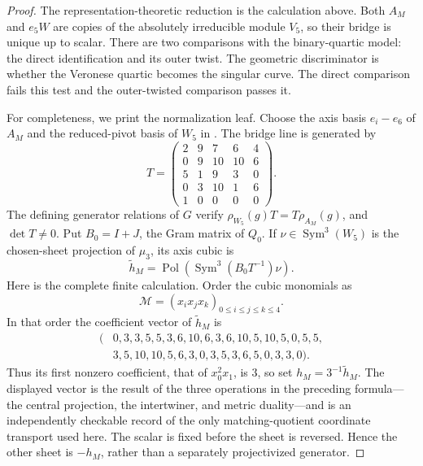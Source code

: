 \documentclass[11pt]{article}
\theoremstyle{definition}
\theoremstyle{remark}
\newcommand{\Sym}{\operatorname{Sym}}
\begin{document}
\begin{proof}
The representation-theoretic reduction is the calculation above.  Both
\(A_M\) and \(e_5W\) are copies of the absolutely irreducible module \(V_5\),
so their bridge is unique up to scalar.  There are two comparisons with the
binary-quartic model: the direct identification and its outer twist.  The
geometric discriminator is whether the Veronese quartic becomes the singular
curve.  The direct comparison fails this test and the outer-twisted
comparison passes it.

For completeness, we print the normalization leaf.  Choose the axis basis
\(e_i-e_6\) of \(A_M\) and the reduced-pivot basis of \(W_5\) in
\cite{RuddFactorization2026}.  The
bridge line is generated by
\[
 T=\begin{pmatrix}
 2&9&7&6&4\\
 0&9&10&10&6\\
 5&1&9&3&0\\
 0&3&10&1&6\\
 1&0&0&0&0
 \end{pmatrix}.
\]
The defining generator relations of \(G\) verify
\(\rho_{W_5}(g)T=T\rho_{A_M}(g)\), and \(\det T\ne0\).  Put \(B_0=I+J\),
the Gram matrix of \(Q_0\).  If \(\nu\in\Sym^3(W_5)\) is the chosen-sheet
projection of \(\mu_3\), its axis cubic is
\[
 \widetilde h_M=
 \operatorname{Pol}\!\left(\Sym^3(B_0T^{-1})\nu\right).
\]
Here is the complete finite calculation.  Order the cubic monomials as
\[
             \mathcal M=(x_ix_jx_k)_{0\leq i\leq j\leq k\leq4}.
\]
In that order the coefficient vector of \(\widetilde h_M\) is
\[
\begin{split}
(&0,3,3,5,5,3,6,10,6,3,6,10,5,10,5,0,5,5,\\
 &3,5,10,10,5,6,3,0,3,5,3,6,5,0,3,3,0).
\end{split}
\]
Thus its first nonzero coefficient, that of \(x_0^2x_1\), is \(3\), so set
\(h_M=3^{-1}\widetilde h_M\).  The displayed vector is the result of the
three operations in the preceding formula---the central projection, the
intertwiner, and metric duality---and is an independently checkable record
of the only matching-quotient coordinate transport used here.  The scalar is fixed
before the sheet is
reversed.  Hence the other sheet is \(-h_M\), rather than a separately
projectivized generator.


\end{proof}
\end{document}
